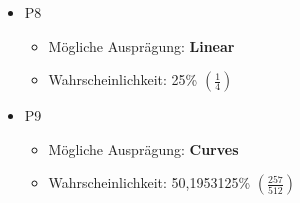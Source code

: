 \begin{NFT-Prop}
\begin{itemize}
\begin{itemize}
    \end{itemize}
    \item P8
    \begin{itemize}
    	\item Mögliche Ausprägung: \textbf{Linear}  
    	\item Wahrscheinlichkeit: 25\% $\left( \frac{1}{4} \right)$
    \end{itemize}
    \item P9
    \begin{itemize}
    	\item Mögliche Ausprägung: \textbf{Curves}
    	\item Wahrscheinlichkeit: 50,1953125\% $\left( \frac{257}{512} \right)$
    \end{itemize}
\end{itemize}

\end{NFT-Prop}

\vspace{0.3cm}

